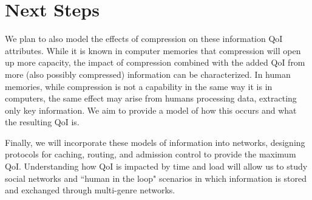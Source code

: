 
\section{Next Steps}
\label{sec:next_steps}

We plan to also model the effects of compression on these information QoI attributes.  While it is known in computer memories that compression will open up more capacity, the impact of compression combined with the added QoI from more (also possibly compressed) information can be characterized.  In human memories, while compression is not a capability in the same way it is in computers, the same effect may arise from humans processing data, extracting only key information.  We aim to provide a model of how this occurs and what the resulting QoI is. 

Finally, we will incorporate these models of information into networks, designing protocols for caching, routing, and admission control to provide the maximum QoI.  Understanding how QoI is impacted by time and load will allow us to study social networks and ``human in the loop" scenarios in which information is stored and exchanged through multi-genre networks.  